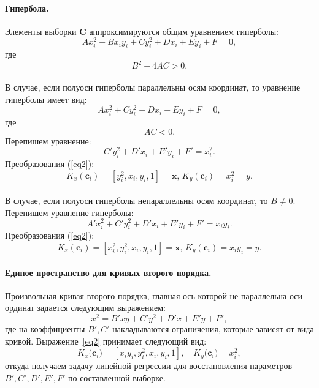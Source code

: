 \documentclass[12pt, twoside]{article}
\numberwithin{equation}{section}
\begin{document}
\paragraph{Гипербола.}
Элементы выборки $\mathbf{C}$ аппроксимируются общим уравнением гиперболы: \begin{equation} Ax_i^2 + Bx_iy_i + Cy_i^2 + Dx_i + Ey_i + F = 0,\end{equation} где \begin{equation} \label{35}
B^2 - 4AC > 0.\end{equation} \\
В случае, если полуоси гиперболы параллельны осям координат, то уравнение гиперболы имеет вид: \begin{equation}  Ax_i^2 + Cy_i^2 + Dx_i + Ey_i + F = 0,\end{equation} где \begin{equation} \label{37}
AC < 0.\end{equation} Перепишем уравнение: \begin{equation}
C'y_i^2 + D'x_i + E'y_i + F' = x_i^2.\end{equation} Преобразования (\ref{eq2}): \begin{equation}
K_{x}(\mathbf{c}_i) = [y_i^2, x_i, y_i, 1] = \mathbf{x}, \,  K_{y}(\mathbf{c}_i) = x_i^2 = y.\end{equation} \\
В случае, если полуоси гиперболы непараллельны осям координат, то $B \neq 0$. Перепишем уравнение гиперболы:\begin{equation}A'x_i^2 + C'y_i^2 + D'x_i + E'y_i + F' =  x_iy_i.\end{equation} Преобразования (\ref{eq2}): \begin{equation}
K_{x}(\mathbf{c}_i) = [x_i^2, y_i^2, x_i, y_i, 1] = \mathbf{x}, \,  K_{y}(\mathbf{c}_i) = x_iy_i = y.\end{equation} 

\paragraph{Единое пространство для кривых второго порядка.} Произвольная кривая второго порядка, главная ось которой не параллельна оси ординат задается следующим выражением:
\[
\label{st:coef}
x^2 = B'xy+C'y^2+D'x+E'y+F',
\]
где на коэффициенты $B',C'$ накладываются ограничения, которые зависят от вида кривой. Выражение~\eqref{eq2} принимает следующий вид:
\[
\label{st:K_map}
K_x\bigr(\mathbf{c}_i\bigr)=\left[x_iy_i, y_i^2, x_i, y_i, 1\right], \quad K_y\bigr(\mathbf{c}_i\bigr)=x_i^2,
\]
откуда получаем задачу линейной регрессии для восстановления параметров~$B', C', D', E', F'$ по составленной выборке.
\end{document}
